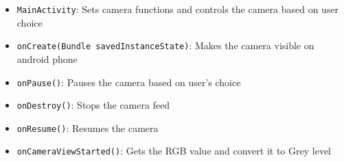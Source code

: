 \documentclass[12pt]{article}
\begin{document}
\begin{itemize}
\item \verb|MainActivity|: Sets camera functions and controls the camera based on user choice
\item \verb|onCreate(Bundle savedInstanceState)|: Makes the camera visible on android phone
\item \verb|onPause()|: Pauses the camera based on user's choice
\item \verb|onDestroy()|: Stops the camera feed
\item \verb|onResume()|: Resumes the camera
\item \verb|onCameraViewStarted()|: Gets the RGB value and convert it to Grey level
\end{itemize}



\end{document}
